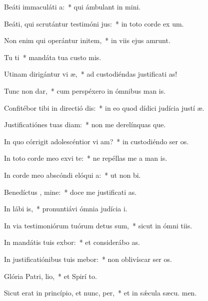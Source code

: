 \item Beáti immaculáti  a:~* qui ámbulant in  mini.
\item Beáti, qui scrutántur testimóni jus:~* in toto corde ex um.
\item Non enim qui operántur initem,~* in viis ejus amrunt.
\item Tu ti~* mandáta tua custo mis.
\item Utinam dirigántur vi æ,~* ad custodiéndas justificati as!
\item Tunc non dar,~* cum perspéxero in ómnibus man is.
\item Confitébor tibi in directió dis:~* in eo quod dídici judícia justí æ.
\item Justificatiónes tuas diam:~* non me derelínquas que.
\item In quo córrigit adolescéntior vi am?~* in custodiéndo ser os.
\item In toto corde meo exvi te:~* ne repéllas me a man is.
\item In corde meo abscóndi elóqui a:~* ut non  bi.
\item Benedíctus , mine:~* doce me justificati as.
\item In lábi is,~* pronuntiávi ómnia judícia  i.
\item In via testimoniórum tuórum detus sum,~* sicut in ómni tiis.
\item In mandátis tuis exbor:~* et considerábo  as.
\item In justificatiónibus tuis mebor:~* non oblivíscar ser os.
\item Glória Patri,  lio,~* et Spirí to.
\item Sicut erat in princípio, et nunc,  per,~* et in sǽcula sæcu. men.
